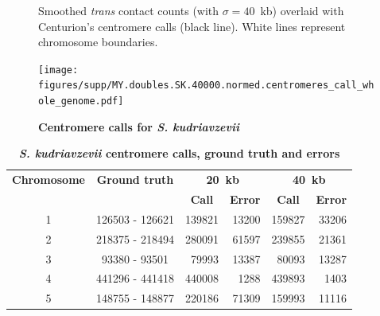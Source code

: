 \clearpage

\begin{figure}[ht!]
\caption{\textbf{Centromere calls for \textit{S. kudriavzevii}}}
{Smoothed \textit{trans} contact counts (with $\sigma=40$~kb) overlaid with
Centurion's centromere calls (black line). White lines represent chromosome
boundaries.
}
\begin{center}
\texttt{[image: figures/supp/MY.doubles.SK.40000.normed.centromeres\_call\_whole\_genome.pdf]}
\end{center}
\label{suppfig:SK_calls}
\end{figure}


\begin{table}[ht!]
\caption{\textbf{\textit{S. kudriavzevii} centromere calls, ground truth and errors}}
\begin{center}
\begin{tabular}{c | c  r  r  r  r}
\textbf{Chromosome}  & \textbf{Ground truth} & \multicolumn{2}{c}{\textbf{20~kb}} & \multicolumn{2}{c}{\textbf{40~kb}} \\
  &   &  \multicolumn{1}{c}{\textbf{Call}} &  \multicolumn{1}{c}{\textbf{Error}} &  \multicolumn{1}{c}{\textbf{Call}} &  \multicolumn{1}{c}{\textbf{Error}} \\
\hline
1 & \num[group-separator={\,}]{126503} - \num[group-separator={\,}]{126621} & \num[group-separator={\,}]{139821} & \small{\num[group-separator={\,}]{13200}}  & \num[group-separator={\,}]{159827} & \small{\num[group-separator={\,}]{33206}}  \\
2 & \num[group-separator={\,}]{218375} - \num[group-separator={\,}]{218494} & \num[group-separator={\,}]{280091} & \small{\num[group-separator={\,}]{61597}}  & \num[group-separator={\,}]{239855} & \small{\num[group-separator={\,}]{21361}}  \\
3 & \num[group-separator={\,}]{93380} - \num[group-separator={\,}]{93501} & \num[group-separator={\,}]{79993} & \small{\num[group-separator={\,}]{13387}}  & \num[group-separator={\,}]{80093} & \small{\num[group-separator={\,}]{13287}}  \\
4 & \num[group-separator={\,}]{441296} - \num[group-separator={\,}]{441418} & \num[group-separator={\,}]{440008} & \small{\num[group-separator={\,}]{1288}}  & \num[group-separator={\,}]{439893} & \small{\num[group-separator={\,}]{1403}}  \\
5 & \num[group-separator={\,}]{148755} - \num[group-separator={\,}]{148877} & \num[group-separator={\,}]{220186} & \small{\num[group-separator={\,}]{71309}}  & \num[group-separator={\,}]{159993} & \small{\num[group-separator={\,}]{11116}}  \\

\end{tabular}
\end{center}
\end{table}
